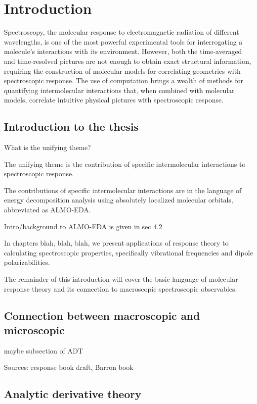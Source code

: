 \documentclass[%
class = book,%
crop = false,%
float = true,%
multi = true,%
preview = false,%
]{standalone}
\begin{document}
\chapter{Introduction}
\label{ch:introduction}

Spectroscopy, the molecular response to electromagnetic radiation of different wavelengths, is one of the most powerful experimental tools for interrogating a molecule's interactions with its environment. However, both the time-averaged and time-resolved pictures are not enough to obtain exact structural information, requiring the construction of molecular models for correlating geometries with spectroscopic response. The use of computation brings a wealth of methods for quantifying intermolecular interactions that, when combined with molecular models, correlate intuitive physical pictures with spectroscopic response.

\section{Introduction to the thesis}
What is the unifying theme?

The unifying theme is the contribution of specific intermolecular interactions to spectroscopic response.

The contributions of specific intermolecular interactions are in the language of energy decomposition analysis using absolutely localized molecular orbitals, abbreviated as ALMO-EDA.

Intro/background to ALMO-EDA is given in sec 4.2

In chapters blah, blah, blah, we present applications of response theory to calculating spectroscopic properties, specifically vibrational frequencies and dipole polarizabilities.

The remainder of this introduction will cover the basic language of molecular response theory and its connection to macroscopic spectroscopic observables.

\section{Connection between macroscopic and microscopic}

maybe subsection of ADT

Sources: response book draft, Barron book

\section{Analytic derivative theory}
\end{document}
